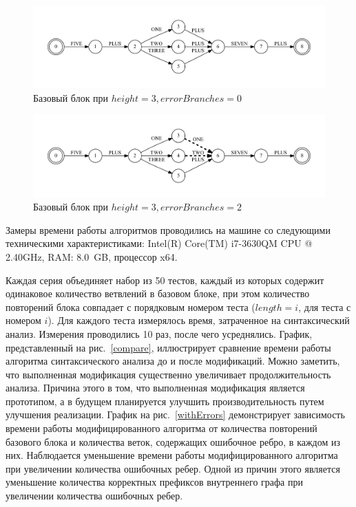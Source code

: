 \begin{figure}[h!]
 \centering
 \includegraphics[width=\textwidth]{Azimov/pictures/block_black.pdf}
 \caption{Базовый блок при $height=3, errorBranches=0$}
 \label{block}
\end{figure}

\begin{figure}[h!]
 \centering
 \includegraphics[width=\textwidth]{Azimov/pictures/errorBlock_black.pdf}
 \caption{Базовый блок при $height=3, errorBranches=2$}
 \label{errorBlock}
\end{figure}

Замеры времени работы алгоритмов проводились на машине со следующими техническими характеристиками: Intel(R) Core(TM) i7-3630QM CPU @ 2.40GHz, RAM: 8.0~GB, процессор x64.

Каждая серия объединяет набор из 50 тестов, каждый из которых содержит одинаковое количество ветвлений в базовом блоке, при этом количество повторений блока совпадает с порядковым номером теста ($length = i$, для теста с номером $i$). Для каждого теста измерялось время, затраченное на синтаксический анализ. Измерения проводились 10 раз, после чего усреднялись. График, представленный на рис.~\ref{compare}, иллюстрирует сравнение времени работы алгоритма синтаксического анализа до и после модификаций. Можно заметить, что выполненная модификация существенно увеличивает продолжительность анализа. Причина этого в том, что выполненная модификация является прототипом, а в будущем планируется улучшить производительность путем улучшения реализации. График на рис.~\ref{withErrors} демонстрирует зависимость времени работы модифицированного алгоритма от количества повторений базового блока и количества веток, содержащих ошибочное ребро, в каждом из них. Наблюдается уменьшение времени работы модифицированного алгоритма при увеличении количества ошибочных ребер. Одной из причин этого является уменьшение количества корректных префиксов внутреннего графа при увеличении количества ошибочных ребер.


